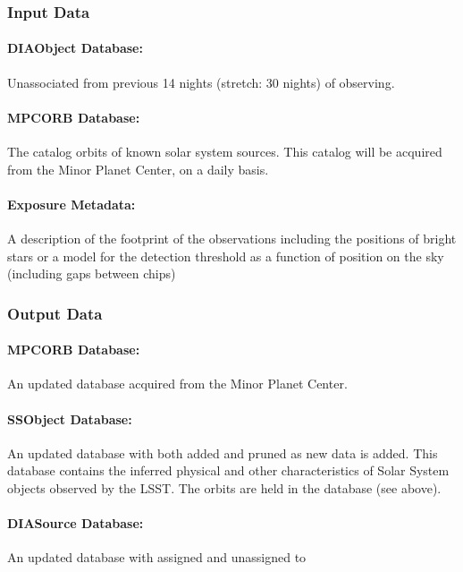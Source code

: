 \subsubsection{Input Data}

\paragraph*{DIAObject Database: } Unassociated \DIASources from previous 14 nights (stretch: 30 nights) of observing.

\paragraph*{MPCORB Database: } The catalog orbits of known solar system sources. This catalog will be acquired from the Minor Planet Center, on a daily basis.

\paragraph*{Exposure Metadata:} A description of the footprint of the observations including the positions of bright stars or a model for the detection threshold as a function of position on the sky (including gaps between chips)


\subsubsection{Output Data}

\paragraph*{MPCORB Database: } An updated \MPCORB database acquired from the Minor Planet Center.

\paragraph*{SSObject Database: } An updated \SSObject database with \SSObjects both added and pruned as new data is added. This database contains the inferred physical and other characteristics of Solar System objects observed by the LSST. The orbits are held in the \MPCORB database (see above).

\paragraph*{DIASource Database:} An updated \DIASource database with \DIASources assigned and unassigned to \SSObjects

